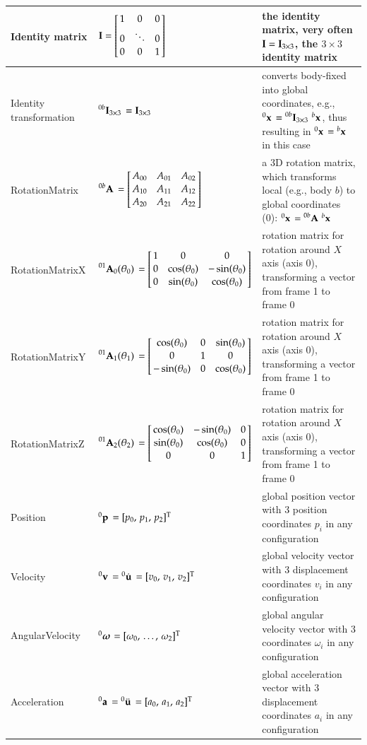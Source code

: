 \begin{center}
\begin{longtable}{| p{5cm} | p{5cm} | p{6cm} |}
    Identity matrix & $\Im = \mr{1}{0}{0} {0}{\ddots}{0} {0}{0}{1}$ & the identity matrix, very often $\mathbf{I} = \mathbf{I}_{3 \times 3}$, the $3 \times 3$ identity matrix \\ \hline
    Identity transformation & $\prescript{0b}{}{\mathbf{I}_{3 \times 3}}\, = \mathbf{I}_{3 \times 3}$ & converts body-fixed into global coordinates, e.g., $\prescript{0}{}{\mathbf{x}}\, = \prescript{0b}{}{\mathbf{I}_{3 \times 3}}\, \prescript{b}{}{\mathbf{x}}\,$, thus resulting in $\prescript{0}{}{\mathbf{x}}\, = \prescript{b}{}{\mathbf{x}}\,$ in this case\\ \hline
    RotationMatrix & $\LU{0b}{\Rot} = \mr{A_{00}}{A_{01}}{A_{02}} {A_{10}}{A_{11}}{A_{12}} {A_{20}}{A_{21}}{A_{22}}$ & a 3D rotation matrix, which transforms local (e.g., body $b$) to global coordinates (0): $\prescript{0}{}{\mathbf{x}}\, = \prescript{0b}{}{\mathbf{A}}\, \prescript{b}{}{\mathbf{x}}\,$\\ \hline
    RotationMatrixX & $\LU{01}{\Rot_0(\theta_0)} = 
		\mr{1}{0}{0} {0}{\cos(\theta_0)}{-\sin(\theta_0)} {0}{\sin(\theta_0)}{\cos(\theta_0)}$ & rotation matrix for rotation around $X$ axis (axis 0), transforming a vector from frame 1 to frame 0\\ \hline    
		RotationMatrixY & $\LU{01}{\Rot_1(\theta_1)} = 
		\mr{\cos(\theta_0)}{0}{\sin(\theta_0)} {0}{1}{0} {-\sin(\theta_0)}{0}{\cos(\theta_0)}$ & rotation matrix for rotation around $X$ axis (axis 0), transforming a vector from frame 1 to frame 0\\ \hline    %
    RotationMatrixZ & $\LU{01}{\Rot_2(\theta_2)} = 
		\mr{\cos(\theta_0)}{-\sin(\theta_0)}{0} {\sin(\theta_0)}{\cos(\theta_0)}{0} {0}{0}{1}$ & rotation matrix for rotation around $X$ axis (axis 0), transforming a vector from frame 1 to frame 0\\ \hline    
		Position & $\prescript{0}{}{\mathbf{p}}\, = [p_0,\, p_1,\, p_2]^\mathrm{T}$ & global position vector with 3 position coordinates $p_i$ in any configuration\\ \hline
		Velocity & $\prescript{0}{}{\mathbf{v}}\, = \prescript{0}{}{\dot {\mathbf{u}}}\, = [v_0,\, v_1,\, v_2]^\mathrm{T}$ & global velocity vector with 3 displacement coordinates $v_i$ in any configuration\\ \hline
    AngularVelocity & $\prescript{0}{}{\mbox{\boldmath $\omega$ \unboldmath}\!\!}\, = [\omega_0,\, \ldots,\, \omega_2]^\mathrm{T}$ & global angular velocity vector with $3$ coordinates $\omega_i$ in any configuration\\ \hline
    Acceleration & $\prescript{0}{}{\mathbf{a}}\, = \prescript{0}{}{\ddot {\mathbf{u}}}\, = [a_0,\, a_1,\, a_2]^\mathrm{T}$ & global acceleration vector with 3 displacement coordinates $a_i$ in any configuration\\ \hline

\end{longtable}
\end{center}
